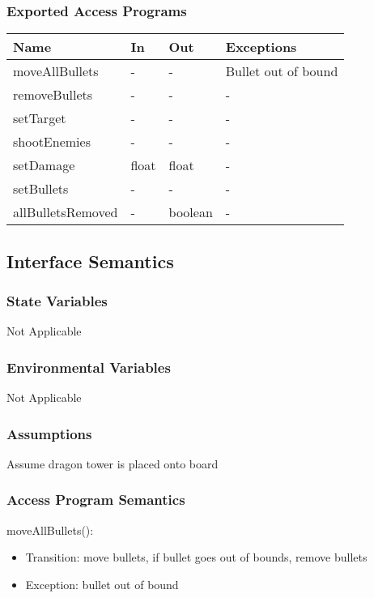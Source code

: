\documentclass[12,english]{article}
\begin{document}
\subsubsection{Exported Access Programs}
\begin{table}[h!]
    \centering
    \begin{tabular}{|p{4cm}|p{2cm}|p{2cm}|p{2cm}|}
    \hline
    \textbf {Name}  & {In} & {Out} & {Exceptions} \\
    \hline
    moveAllBullets & - & - & Bullet out of bound\\
    \hline
    removeBullets & - & - & -\\
    \hline 
    setTarget & - & - & -\\
    \hline
    shootEnemies & - & - & -\\
    \hline
    setDamage & float & float & -\\
    \hline
    setBullets & - & - & -\\
    \hline
    allBulletsRemoved & - & boolean & -\\
    \hline
    \end{tabular}
\end{table}
\subsection{Interface Semantics}
\subsubsection{State Variables}
Not Applicable
\subsubsection{Environmental Variables}
Not Applicable
\subsubsection{Assumptions}
Assume dragon tower is placed onto board
\subsubsection{Access Program Semantics}

\noindent moveAllBullets():
\begin{itemize}
    \item Transition: move bullets, if bullet goes out of bounds, remove bullets
    \item Exception: bullet out of bound
\end{itemize}
\end{document}
